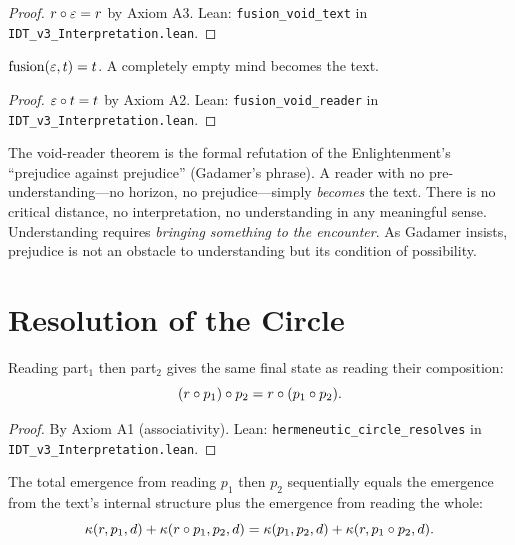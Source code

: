 \begin{proof}
$r \circ \varepsilon = r$ by Axiom A3.
Lean: \texttt{fusion\_void\_text} in \texttt{IDT\_v3\_Interpretation.lean}.
\end{proof}

\begin{theorem}
\label{thm:fusion-void-reader}
$\mathrm{fusion}(\varepsilon, t) = t$. A completely empty mind becomes the text.
\end{theorem}

\begin{proof}
$\varepsilon \circ t = t$ by Axiom A2.
Lean: \texttt{fusion\_void\_reader} in \texttt{IDT\_v3\_Interpretation.lean}.
\end{proof}

\begin{interpretation}
The void-reader theorem is the formal refutation of the Enlightenment's
``prejudice against prejudice'' (Gadamer's phrase). A reader with no
pre-understanding---no horizon, no prejudice---simply \emph{becomes} the text.
There is no critical distance, no interpretation, no understanding in any
meaningful sense. Understanding requires \emph{bringing something to the
encounter}. As Gadamer insists, prejudice is not an obstacle to understanding
but its condition of possibility.
\end{interpretation}

\section{Resolution of the Circle}

\begin{theorem}
\label{thm:circle-resolves}
Reading part$_1$ then part$_2$ gives the same final state as reading their
composition:
\[
(r \circ p_1) \circ p_2 = r \circ (p_1 \circ p_2).
\]
\end{theorem}

\begin{proof}
By Axiom A1 (associativity).
Lean: \texttt{hermeneutic\_circle\_resolves} in \texttt{IDT\_v3\_Interpretation.lean}.
\end{proof}

\begin{theorem}
\label{thm:emergence-path}
The total emergence from reading $p_1$ then $p_2$ sequentially equals the
emergence from the text's internal structure plus the emergence from reading
the whole:
\[
\kappa(r, p_1, d) + \kappa(r \circ p_1, p_2, d)
= \kappa(p_1, p_2, d) + \kappa(r, p_1 \circ p_2, d).
\]
\end{theorem}

